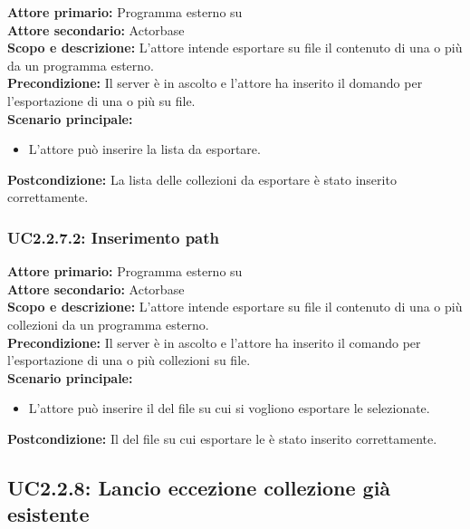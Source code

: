 \documentclass{scalatekids-article}
\begin{document}
\textbf{Attore primario:} Programma esterno su \\
\textbf{Attore secondario:} Actorbase\\
\textbf{Scopo e descrizione:} L'attore intende esportare su file il contenuto di una o più  da un programma  esterno.\\
\textbf{Precondizione:} Il server è in ascolto e l'attore ha inserito il domando per l'esportazione di una o più  su file.\\
\textbf{Scenario principale:}
\begin{itemize}
\item L'attore può inserire la lista  da esportare.
\end{itemize}
\textbf{Postcondizione:} La lista delle collezioni da esportare è stato inserito correttamente.

\subsubsection{UC2.2.7.2: Inserimento path}

\textbf{Attore primario:} Programma esterno su \\
\textbf{Attore secondario:} Actorbase\\
\textbf{Scopo e descrizione:} L'attore intende esportare su file il contenuto di una o più collezioni da un programma  esterno.\\
\textbf{Precondizione:} Il server è in ascolto e l'attore ha inserito il comando per l'esportazione di una o più collezioni su file.\\
\textbf{Scenario principale:}
\begin{itemize}
\item L'attore può inserire il  del file su cui si vogliono esportare le  selezionate.
\end{itemize}
\textbf{Postcondizione:} Il  del file su cui esportare le  è stato inserito correttamente.

\subsection{UC2.2.8: Lancio eccezione collezione già esistente}
\end{document}
